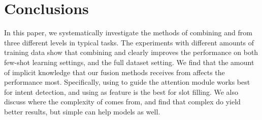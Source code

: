 \section{Conclusions}
In this paper, we systematically investigate the methods of combining \NN and \RE from three different levels in typical \SLU tasks. 
The experiments with different amounts of training data show that combining \NN and \RE clearly improves the \NN performance on both few-shot learning settings, and the  full dataset setting. 
We find that the amount of implicit knowledge that our fusion methods receives from \REs affects the performance most.
Specifically, using \REs to guide the attention module works best for intent detection, and using \REtags as feature is the best for slot filling.
We also discuss where the complexity of \REs comes from, and find that complex \REs do yield better results, but simple \REs can help \NN models as well.